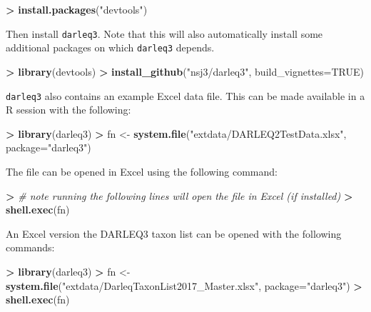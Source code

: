 \documentclass[
]{article}
\newenvironment{Shaded}{\begin{snugshade}}{\end{snugshade}}
\newcommand{\CommentTok}[1]{\textcolor[rgb]{0.56,0.35,0.01}{\textit{#1}}}
\newcommand{\DataTypeTok}[1]{\textcolor[rgb]{0.13,0.29,0.53}{#1}}
\newcommand{\ErrorTok}[1]{\textcolor[rgb]{0.64,0.00,0.00}{\textbf{#1}}}
\newcommand{\KeywordTok}[1]{\textcolor[rgb]{0.13,0.29,0.53}{\textbf{#1}}}
\newcommand{\NormalTok}[1]{#1}
\newcommand{\OperatorTok}[1]{\textcolor[rgb]{0.81,0.36,0.00}{\textbf{#1}}}
\newcommand{\OtherTok}[1]{\textcolor[rgb]{0.56,0.35,0.01}{#1}}
\newcommand{\StringTok}[1]{\textcolor[rgb]{0.31,0.60,0.02}{#1}}
\begin{document}
\begin{Shaded}
\begin{Highlighting}[]
\OperatorTok{>}\StringTok{ }\KeywordTok{install.packages}\NormalTok{(}\StringTok{"devtools"}\NormalTok{)}
\end{Highlighting}
\end{Shaded}

Then install \texttt{darleq3}. Note that this will also automatically
install some additional packages on which \texttt{darleq3} depends.

\begin{Shaded}
\begin{Highlighting}[]
\OperatorTok{>}\StringTok{ }\KeywordTok{library}\NormalTok{(devtools)}
\OperatorTok{>}\StringTok{ }\KeywordTok{install_github}\NormalTok{(}\StringTok{"nsj3/darleq3"}\NormalTok{, }\DataTypeTok{build_vignettes=}\OtherTok{TRUE}\NormalTok{)}
\end{Highlighting}
\end{Shaded}

\texttt{darleq3} also contains an example Excel data file. This can be
made available in a R session with the following:

\begin{Shaded}
\begin{Highlighting}[]
\OperatorTok{>}\StringTok{ }\KeywordTok{library}\NormalTok{(darleq3)}
\OperatorTok{>}\StringTok{ }\NormalTok{fn <-}\StringTok{ }\KeywordTok{system.file}\NormalTok{(}\StringTok{"extdata/DARLEQ2TestData.xlsx"}\NormalTok{, }\DataTypeTok{package=}\StringTok{"darleq3"}\NormalTok{)}
\end{Highlighting}
\end{Shaded}

The file can be opened in Excel using the following command:

\begin{Shaded}
\begin{Highlighting}[]
\OperatorTok{>}\StringTok{ }\CommentTok{# note running the following lines will open the file in Excel (if installed)}
\ErrorTok{>}\StringTok{ }\KeywordTok{shell.exec}\NormalTok{(fn)}
\end{Highlighting}
\end{Shaded}

An Excel version the DARLEQ3 taxon list can be opened with the following
commands:

\begin{Shaded}
\begin{Highlighting}[]
\OperatorTok{>}\StringTok{ }\KeywordTok{library}\NormalTok{(darleq3)}
\OperatorTok{>}\StringTok{ }\NormalTok{fn <-}\StringTok{ }\KeywordTok{system.file}\NormalTok{(}\StringTok{"extdata/DarleqTaxonList2017_Master.xlsx"}\NormalTok{, }\DataTypeTok{package=}\StringTok{"darleq3"}\NormalTok{)}
\OperatorTok{>}\StringTok{ }\KeywordTok{shell.exec}\NormalTok{(fn)}
\end{Highlighting}
\end{Shaded}
\end{document}
